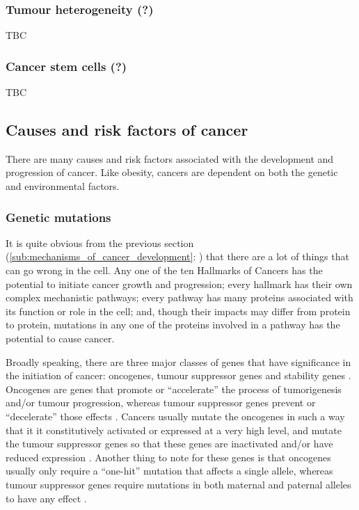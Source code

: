\subsubsection{Tumour heterogeneity (?)}
\label{subsub:tumour_heterogeneity}
TBC

\subsubsection{Cancer stem cells (?)}
\label{ssub:cancer_stem_cells}
TBC

\subsection{Causes and risk factors of cancer}
\label{sub:causes_and_risk_factors_of_cancer}

There are many causes and risk factors associated with the development and progression of cancer.
Like obesity, cancers are dependent on both the genetic and environmental factors.

\subsubsection{Genetic mutations}
\label{ssub:Genetic mutations}

It is quite obvious from the previous section (\cref{sub:mechanisms_of_cancer_development}: ) that there are a lot of things that can go wrong in the cell.
Any one of the ten Hallmarks of Cancers has the potential to initiate cancer growth and progression; every hallmark has their own complex mechanistic pathways; every pathway has many proteins associated with its function or role in the cell; and, though their impacts may differ from protein to protein, mutations in any one of the proteins involved in a pathway has the potential to cause cancer.

Broadly speaking, there are three major classes of genes that have significance in the initiation of cancer: oncogenes, tumour suppressor genes and stability genes \citep{Vogelstein2004a}.
Oncogenes are genes that promote or ``accelerate'' the process of tumorigenesis and/or tumour progression, whereas tumour suppressor genes prevent or ``decelerate'' those effects \citep{Vogelstein2004a}.
Cancers usually mutate the oncogenes in such a way that it it constitutively activated or expressed at a very high level, and mutate the tumour suppressor genes so that these genes are inactivated and/or have reduced expression \citep{Vogelstein2004a}.
Another thing to note for these genes is that oncogenes usually only require a ``one-hit'' mutation that affects a single allele, whereas tumour suppressor genes require mutations in both maternal and paternal alleles to have any effect \citep{Stratton2009,Vogelstein2004a}.


